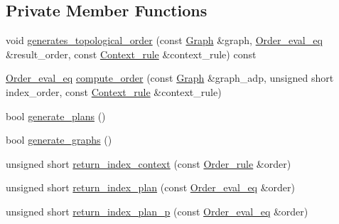 \subsection*{Private Member Functions}
\begin{CompactItemize}
\item 
void \hyperlink{classgenevalmag_1_1Builder__plans_9293c2318f2a323616fc49505a44e4e3}{generates\_\-topological\_\-order} (const \hyperlink{namespacegenevalmag_4a96de9ebfc7d48233406ab9cad55cb5}{Graph} \&graph, \hyperlink{namespacegenevalmag_0bb2e8b0fa1b07b873f0363719de7b64}{Order\_\-eval\_\-eq} \&result\_\-order, const \hyperlink{structgenevalmag_1_1c__rule}{Context\_\-rule} \&context\_\-rule) const 
\item 
\hyperlink{namespacegenevalmag_0bb2e8b0fa1b07b873f0363719de7b64}{Order\_\-eval\_\-eq} \hyperlink{classgenevalmag_1_1Builder__plans_86e05ee91d27e62d16d77ecbdec05bf7}{compute\_\-order} (const \hyperlink{namespacegenevalmag_4a96de9ebfc7d48233406ab9cad55cb5}{Graph} \&graph\_\-adp, unsigned short index\_\-order, const \hyperlink{structgenevalmag_1_1c__rule}{Context\_\-rule} \&context\_\-rule)
\item 
bool \hyperlink{classgenevalmag_1_1Builder__plans_5002819447c17a1f81c197da66bd3e56}{generate\_\-plans} ()
\item 
bool \hyperlink{classgenevalmag_1_1Builder__plans_9552dcef13af0de0f3f2ff59a330d15c}{generate\_\-graphs} ()
\item 
unsigned short \hyperlink{classgenevalmag_1_1Builder__plans_e44e39bd410967f7f882100b33fb3405}{return\_\-index\_\-context} (const \hyperlink{namespacegenevalmag_ed20da32fb9692645ae53d911d274fd5}{Order\_\-rule} \&order)
\item 
unsigned short \hyperlink{classgenevalmag_1_1Builder__plans_0a0fba0d3630f02c280f9d3997c6bd80}{return\_\-index\_\-plan} (const \hyperlink{namespacegenevalmag_0bb2e8b0fa1b07b873f0363719de7b64}{Order\_\-eval\_\-eq} \&order)
\item 
unsigned short \hyperlink{classgenevalmag_1_1Builder__plans_08c73ceb7e4bbd71732cac943ccfbaa9}{return\_\-index\_\-plan\_\-p} (const \hyperlink{namespacegenevalmag_0bb2e8b0fa1b07b873f0363719de7b64}{Order\_\-eval\_\-eq} \&order)
\end{CompactItemize}
